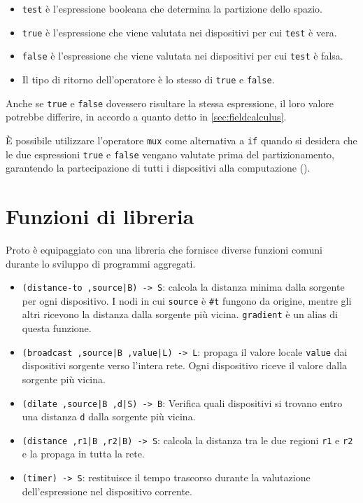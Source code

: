 

\begin{itemize}
    \item \texttt{test} è l'espressione booleana che determina la partizione dello spazio.
    \item \texttt{true} è l'espressione che viene valutata nei dispositivi per cui \texttt{test} è vera.
    \item \texttt{false} è l'espressione che viene valutata nei dispositivi per cui \texttt{test} è falsa.
    \item Il tipo di ritorno dell'operatore è lo stesso di \texttt{true} e \texttt{false}.
\end{itemize}

Anche se \texttt{true} e \texttt{false} dovessero risultare la stessa espressione, il loro valore potrebbe differire, in accordo a quanto detto in \cref{sec:fieldcalculus}.

È possibile utilizzare l'operatore \texttt{mux} come alternativa a \texttt{if} quando si desidera che le due espressioni \texttt{true} e \texttt{false} vengano valutate prima del partizionamento, garantendo la partecipazione di tutti i dispositivi alla computazione ().

\section{Funzioni di libreria}
\label{sec:mitprotobuiltin}

Proto è equipaggiato con una libreria che fornisce diverse funzioni comuni durante lo sviluppo di programmi aggregati. 

\begin{itemize}
    \item \texttt{(distance-to ,source|B) -> S}: calcola la distanza minima dalla sorgente per ogni dispositivo. I nodi in cui \texttt{source} è \texttt{\#t} fungono da origine, mentre gli altri ricevono la distanza dalla sorgente più vicina. \texttt{gradient} è un alias di questa funzione.
    \item \texttt{(broadcast ,source|B ,value|L) -> L}: propaga il valore locale \texttt{value} dai dispositivi sorgente verso l'intera rete. Ogni dispositivo riceve il valore dalla sorgente più vicina.
    \item \texttt{(dilate ,source|B ,d|S) -> B}: Verifica quali dispositivi si trovano entro una distanza \texttt{d} dalla sorgente più vicina.
    \item \texttt{(distance ,r1|B ,r2|B) -> S}: calcola la distanza tra le due regioni \texttt{r1} e \texttt{r2} e la propaga in tutta la rete.
    \item \texttt{(timer) -> S}: restituisce il tempo trascorso durante la valutazione dell'espressione nel dispositivo corrente.
\end{itemize}

